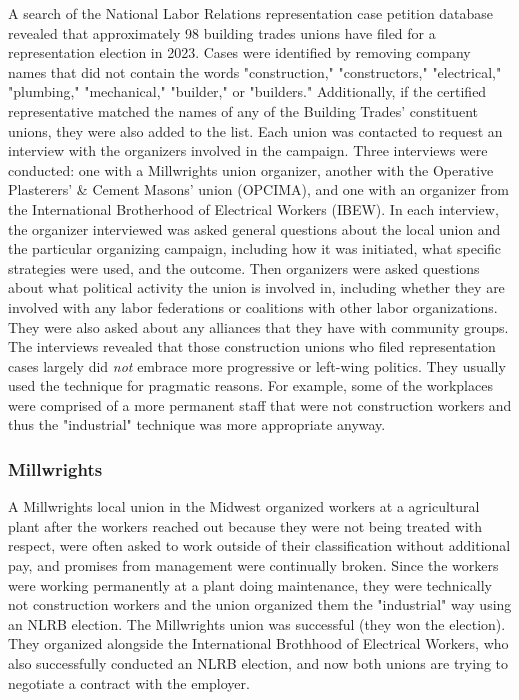 \documentclass[12pt]{article}
\begin{document}
A search of the National Labor Relations representation case petition database revealed that approximately 98 building trades unions have filed for a representation election in 2023. Cases were identified by removing company names that did not contain the words "construction," "constructors," "electrical," "plumbing," "mechanical," "builder," or "builders." Additionally, if the certified representative matched the names of any of the Building Trades’ constituent unions, they were also added to the list. Each union was contacted to request an interview with the organizers involved in the campaign. Three interviews were conducted: one with a Millwrights union organizer, another with the Operative Plasterers' \& Cement Masons' union (OPCIMA), and one with an organizer from the International Brotherhood of Electrical Workers (IBEW). In each interview, the organizer interviewed was asked general questions about the local union and the particular organizing campaign, including how it was initiated, what specific strategies were used, and the outcome. Then organizers were asked questions about what political activity the union is involved in, including whether they are involved with any labor federations or coalitions with other labor organizations. They were also asked about any alliances that they have with community groups. The interviews revealed that those construction unions who filed representation cases largely did \emph{not} embrace more progressive or left-wing politics. They usually used the technique for pragmatic reasons. For example, some of the workplaces were comprised of a more permanent staff that were not construction workers and thus the "industrial" technique was more appropriate anyway.

\subsubsection{Millwrights}

A Millwrights local union in the Midwest organized workers at a agricultural plant after the workers reached out because they were not being treated with respect, were often asked to work outside of their classification without additional pay, and promises from management were continually broken. Since the workers were working permanently at a plant doing maintenance, they were technically not construction workers and the union organized them the "industrial" way using an NLRB election. The Millwrights union was successful (they won the election). They organized alongside the International Brothhood of Electrical Workers, who also successfully conducted an NLRB election, and now both unions are trying to negotiate a contract with the employer.
\end{document}
